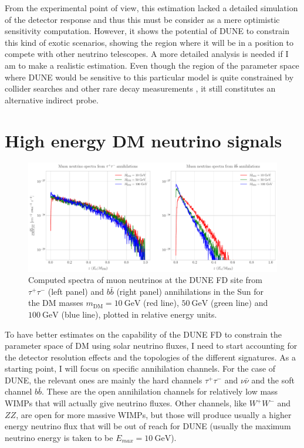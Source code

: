 From the experimental point of view, this estimation lacked a detailed simulation of the detector response and thus this must be consider as a mere optimistic sensitivity computation. However, it shows the potential of DUNE to constrain this kind of exotic scenarios, showing the region where it will be in a position to compete with other neutrino telescopes. A more detailed analysis is needed if I am to make a realistic estimation. Even though the region of the parameter space where DUNE would be sensitive to this particular model is quite constrained by collider searches \cite{Deutschmann2017} and other rare decay measurements \cite{Haisch2007, Freitas2008}, it still constitutes an alternative indirect probe.

\section{High energy DM neutrino signals}
\label{sec:dm_analysis_high_e_nu}

\begin{figure}[t]
	\centering
	\includegraphics[width=1\linewidth]{Images/DM_Analysis/solardm_nu_mu_spectra.pdf}
	\caption[Computed spectra of muon neutrinos at the DUNE FD site from $\tau^{+} \tau^{-}$ and $b\bar{b}$ annihilations in the Sun for different DM masses.]{Computed spectra of muon neutrinos at the DUNE FD site from $\tau^{+} \tau^{-}$ (left panel) and $b\bar{b}$ (right panel) annihilations in the Sun for the DM masses $m_{\mathrm{DM}} = 10 \ \mathrm{GeV}$ (red line), $50 \ \mathrm{GeV}$ (green line) and $100 \ \mathrm{GeV}$ (blue line), plotted in relative energy units.}
	\label{fig:solardm_nu_mu_spectra}
\end{figure}

To have better estimates on the capability of the DUNE FD to constrain the parameter space of DM using solar neutrino fluxes, I need to start accounting for the detector resolution effects and the topologies of the different signatures. As a starting point, I will focus on specific annihilation channels. For the case of DUNE, the relevant ones are mainly the hard channels $\tau^{+} \tau^{-}$ and $\nu \bar{\nu}$ and the soft channel $b\bar{b}$. These are the open annihilation channels for relatively low mass WIMPs that will actually give neutrino fluxes. Other channels, like $W^{+} W^{-}$ and $ZZ$, are open for more massive WIMPs, but those will produce usually a higher energy neutrino flux that will be out of reach for DUNE (usually the maximum neutrino energy is taken to be $E_{max} = 10 \ \mathrm{GeV}$).

